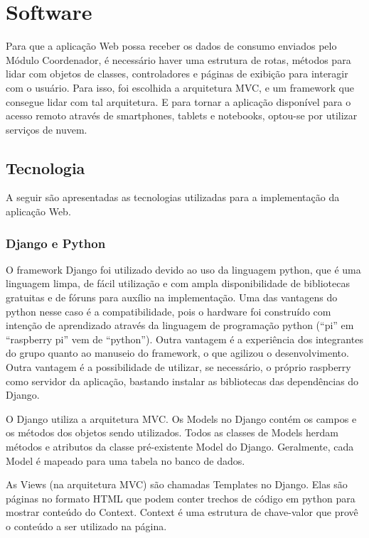\section{Software}
\label{Sec:software}
Para que a aplicação Web possa receber os dados de consumo enviados pelo Módulo Coordenador, é necessário haver uma estrutura de rotas, métodos para lidar com objetos de classes, controladores e páginas de exibição para interagir com o usuário. Para isso, foi escolhida a arquitetura MVC, e um framework que consegue lidar com tal arquitetura. E para tornar a aplicação disponível para o acesso remoto através de smartphones, tablets e notebooks, optou-se por utilizar serviços de nuvem. 

\subsection{Tecnologia}

A seguir são apresentadas as tecnologias utilizadas para a implementação da aplicação Web.

\subsubsection{Django e Python}

O framework Django foi utilizado devido ao uso da linguagem python, que é uma linguagem limpa, de fácil utilização e com ampla disponibilidade de bibliotecas gratuitas e de fóruns para auxílio na implementação. Uma das vantagens do python nesse caso é a compatibilidade, pois o hardware foi construído com intenção de aprendizado através da linguagem de programação python \cite{raspberry_pi_site}(``pi'' em ``raspberry pi'' vem de ``python''). Outra vantagem é a experiência dos integrantes do grupo quanto ao manuseio do framework, o que agilizou o desenvolvimento. Outra vantagem é a possibilidade de utilizar, se necessário, o próprio raspberry como servidor da aplicação, bastando instalar as bibliotecas das dependências do Django.

O Django utiliza a arquitetura MVC. Os Models no Django contém os campos e os métodos dos objetos sendo utilizados. Todos as classes de Models herdam métodos e atributos da classe pré-existente Model do Django. Geralmente, cada Model é mapeado para uma tabela no banco de dados.

As Views (na arquitetura MVC) são chamadas Templates no Django. Elas são páginas no formato HTML que podem conter trechos de código em python para mostrar conteúdo do Context. Context é uma estrutura de chave-valor que provê o conteúdo a ser utilizado na página.


